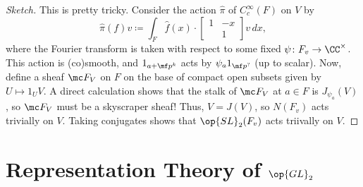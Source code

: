 \documentclass{article}
\begin{document}
\begin{proof}[Sketch]
	This is pretty tricky. Consider the action $\widehat\pi$ of $C_c^\infty(F)$ on $V$ by
	\[\widehat\pi(f)v\coloneqq\int_F\widehat f(x)\cdot\begin{bmatrix}
		1 & -x \\ & 1
	\end{bmatrix}v\,dx,\]
	where the Fourier transform is taken with respect to some fixed $\psi\colon F_v\to\CC^\times$. This action is (co)smooth, and $1_{a+\mf p^k}$ acts by $\psi_a1_{\mf p^?}$ (up to scalar). Now, define a sheaf $\mc F_V$ on $F$ on the base of compact open subsets given by $U\mapsto1_UV$. A direct calculation shows that the stalk of $\mc F_V$ at $a\in F$ is $J_{\psi_a}(V)$, so $\mc F_V$ must be a skyscraper sheaf! Thus, $V=J(V)$, so $N(F_v)$ acts trivially on $V$. Taking conjugates shows that $\op{SL}_2(F_v)$ acts triivally on $V$.
\end{proof}

\section{Representation Theory of \texorpdfstring{$\op{GL}_2$}{GL(2)}}
\end{document}
